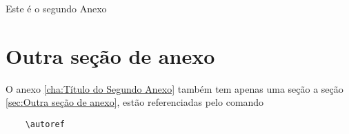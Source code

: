 Este é o segundo Anexo
\section{Outra seção de anexo} %
\label{sec:Outra seção de anexo}
O anexo \autoref{cha:Título do Segundo Anexo} também tem apenas uma seção a seção \autoref{sec:Outra seção de anexo}, estão referenciadas pelo comando

\begin{verbatim}
	\autoref
\end{verbatim}

